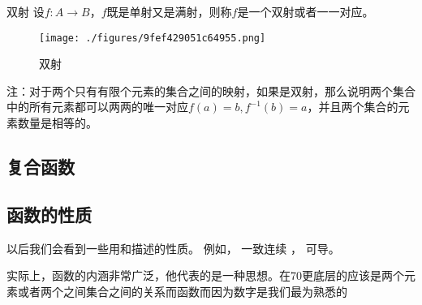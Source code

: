 \begin{definition}{双射}
设$f:A\to{B}$，$f$既是单射又是满射，则称$f$是一个双射或者一一对应。
\end{definition}

\begin{figure}[ht]
\centering
\texttt{[image: ./figures/9fef429051c64955.png]}
\caption{双射} \label{fig_functi_4}
\end{figure}

注：对于两个只有有限个元素的集合之间的映射，如果是双射，那么说明两个集合中的所有元素都可以两两的唯一对应$f(a)=b,f^{-1}(b)=a$，并且两个集合的元素数量是相等的。


\subsection{复合函数}


\subsection{函数的性质}
以后我们会看到一些用和描述的性质。 例如， 一致连续 %
， 可导。


实际上，函数的内涵非常广泛，他代表的是一种思想。在70更底层的应该是两个元素或者两个之间集合之间的关系而函数而因为数字是我们最为熟悉的